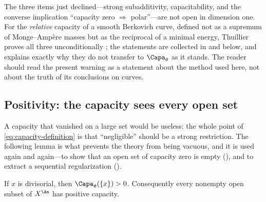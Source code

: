 \begin{remark}
\label{rem:ch25-curve-choquet-unconditional}
The three items just declined---strong subadditivity, capacitability, and
the converse implication ``capacity zero $\Rightarrow$ polar''---are not
open in dimension one.  For the \emph{relative} capacity of a smooth
Berkovich curve, defined not as a supremum of Monge--Amp\`ere masses but as
the reciprocal of a minimal energy, Thuillier proves all three
unconditionally \cite[\S3.6]{Thu05}; the statements are collected in
 and
 below, and
 explains exactly why they do not transfer
to $\Capa_\theta$ as it stands.  The reader should read the present
warning as a statement about the method used here, not about the truth of
its conclusions on curves.
\end{remark}

\subsection{Positivity: the capacity sees every open set}
\label{sec:ch25-positivity}

A capacity that vanished on a large set would be useless: the whole point of
\eqref{eq:capacity-definition} is that ``negligible'' should be a strong
restriction.  The following lemma is what prevents the theory from being
vacuous, and it is used again and again---to show that an open set of
capacity zero is empty (), and to
extract a sequential regularization
().

\begin{lemma}
\label{lem:divisorial-positive-capacity}
If $x$ is divisorial, then $\Capa_\theta(\{x\})>0$. Consequently every
nonempty open subset of $X^{\An}$ has positive capacity.
\end{lemma}


